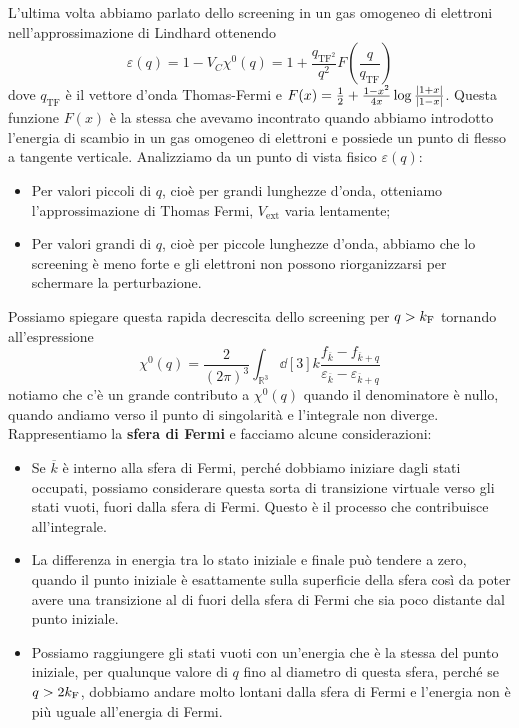 
\vspace{1.0cm}
\vspace{1.0cm}
L'ultima volta abbiamo parlato dello screening in un gas omogeneo di elettroni nell'approssimazione di Lindhard ottenendo
\begin{equation*}
    \varepsilon(q)=1-V_C\chi^0(q)=1+\frac{q_{\text{TF}^2}}{q^2}F\left(\frac{q}{q_{\text{TF}}}\right)
\end{equation*}
dove $q_{\text{TF}}$ è il vettore d'onda Thomas-Fermi e $F(x)=\frac 12 + \frac{1-x^2}{4x}\log\frac{\abs{1+x}}{\abs{1-x}}$. Questa funzione $F(x)$ è la stessa che avevamo incontrato quando abbiamo introdotto l'energia di scambio in un gas omogeneo di elettroni e possiede un punto di flesso a tangente verticale. Analizziamo da un punto di vista fisico $\varepsilon(q)$:
\begin{itemize}
    \item Per valori piccoli di $q$, cioè per grandi lunghezze d'onda, otteniamo l'approssimazione di Thomas Fermi, $V_{\text{ext}}$ varia lentamente;
    \item Per valori grandi di $q$, cioè per piccole lunghezze d'onda, abbiamo che lo screening è meno forte e gli elettroni non possono riorganizzarsi per schermare la perturbazione.
\end{itemize}
Possiamo spiegare questa rapida decrescita dello screening per $q>k_{\text F}$ tornando all'espressione
\begin{equation*}
    \chi^0(q)=\frac{2}{(2\pi)^3}\int_{\mathbb{R}^3}\dd[3]{k}\frac{f_{\overline k}-f_{\overline k+q}}{\varepsilon_{\overline k}-\varepsilon_{\overline k+q}}
\end{equation*}
notiamo che c'è un grande contributo a $\chi^0(q)$ quando il denominatore è nullo, quando andiamo verso il punto di singolarità e l'integrale non diverge. Rappresentiamo la \textbf{sfera di Fermi} e facciamo alcune considerazioni:
\begin{itemize}
    \item Se $\overline k$ è interno alla sfera di Fermi, perché dobbiamo iniziare dagli stati occupati, possiamo considerare questa sorta di transizione virtuale verso gli stati vuoti, fuori dalla sfera di Fermi. Questo è il processo che contribuisce all'integrale.
    \item La differenza in energia tra lo stato iniziale e finale può tendere a zero, quando il punto iniziale è esattamente sulla superficie della sfera così da poter avere una transizione al di fuori della sfera di Fermi che sia poco distante dal punto iniziale.
    \item Possiamo raggiungere gli stati vuoti con un'energia che è la stessa del punto iniziale, per qualunque valore di $q$ fino al diametro di questa sfera, perché se $q>2k_{\text F}$, dobbiamo andare molto lontani dalla sfera di Fermi e l'energia non è più uguale all'energia di Fermi.
\end{itemize}
